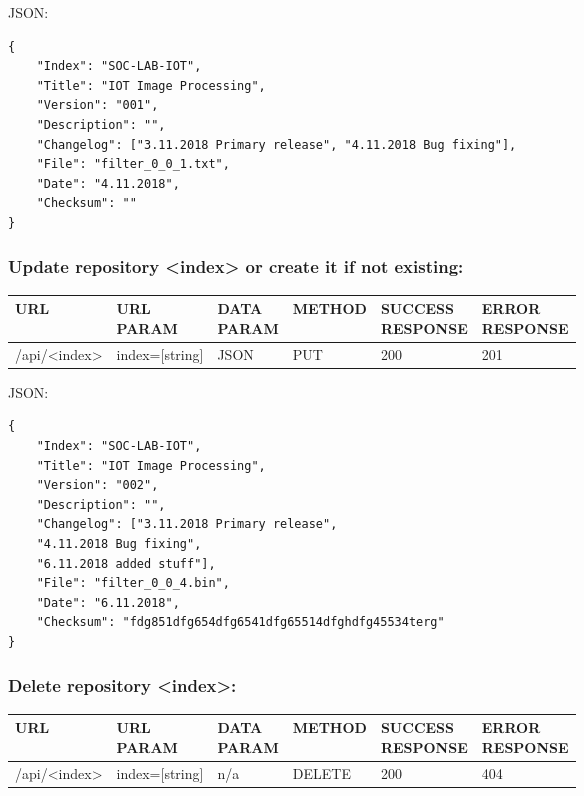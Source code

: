 JSON:
\begin{verbatim}
{
    "Index": "SOC-LAB-IOT",
    "Title": "IOT Image Processing",
    "Version": "001",
    "Description": "",
    "Changelog": ["3.11.2018 Primary release", "4.11.2018 Bug fixing"],
    "File": "filter_0_0_1.txt",
    "Date": "4.11.2018",
    "Checksum": ""
}	    
\end{verbatim}

\subsubsection{Update repository <index> or create it if not existing:}
\begin{table}[h]
    \begin{tabular}[h]{llllll}
    URL          & \specialcell{URL\\PARAM}     & \specialcell{DATA\\PARAM}  & METHOD &  \specialcell{SUCCESS\\RESPONSE} & \specialcell{ERROR\\RESPONSE} \\ \hline
    /api/<index> & index=[string] & JSON  & PUT    & 200              & 201            \\ 
    \end{tabular}
\end{table}

JSON:
\begin{verbatim}
{
    "Index": "SOC-LAB-IOT",
    "Title": "IOT Image Processing",
    "Version": "002",
    "Description": "",
    "Changelog": ["3.11.2018 Primary release", 
    "4.11.2018 Bug fixing", 
    "6.11.2018 added stuff"],
    "File": "filter_0_0_4.bin",
    "Date": "6.11.2018",
    "Checksum": "fdg851dfg654dfg6541dfg65514dfghdfg45534terg"
}	
\end{verbatim}

\subsubsection{Delete repository <index>:}

\begin{table}[h]
    \begin{tabular}[h]{llllll}
    URL          & \specialcell{URL\\PARAM}     & \specialcell{DATA\\PARAM}  & METHOD &  \specialcell{SUCCESS\\RESPONSE} & \specialcell{ERROR\\RESPONSE} \\ \hline
    /api/<index> & index=[string] & n/a        & DELETE & 200              & 404            \\ 
    \end{tabular}
\end{table}

